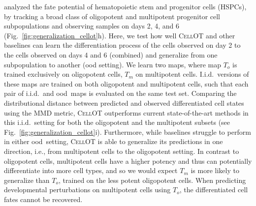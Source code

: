 
\citet{weinreb2020lineage} analyzed the fate potential of hematopoietic stem and progenitor cells (HSPCs), by tracking a broad class of oligopotent %
and multipotent %
 progenitor cell subpopulations and observing samples on days 2, 4, and 6 (Fig.~\ref{fig:generalization_cellot}h).
Here, we test how well \textsc{CellOT} and other baselines can learn the differentiation process of the cells observed on day 2 to the cells observed on days 4 and 6 (combined) and generalize from one subpopulation to another (\acrshort{ood} setting).
We learn two maps, where map $T_o$ is trained exclusively on oligopotent cells, $T_m$ on multipotent cells.
I.i.d.~versions of these maps are trained on both oligopotent and multipotent cells, such that each pair of i.i.d.~and \acrshort{ood}~maps is evaluated on the same test set.
Comparing the distributional distance between predicted and observed differentiated cell states using the \acrshort{MMD} metric, \textsc{CellOT} outperforms current state-of-the-art methods in this i.i.d.~setting for both the oligopotent and the multipotent subsets (see Fig.~\ref{fig:generalization_cellot}i).
Furthermore, while baselines struggle to perform in either \acrshort{ood}~setting, \textsc{CellOT} is able to generalize its predictions in one direction, i.e., from multipotent cells to the oligopotent setting.
In contrast to oligopotent cells, multipotent cells have a higher potency and thus can potentially differentiate into more cell types, and so we would expect $T_m$ is more likely to generalize than $T_o$, trained on the less potent oligopotent cells.
When predicting developmental perturbations on multipotent cells using $T_o$, the differentiated cell fates cannot be recovered.

